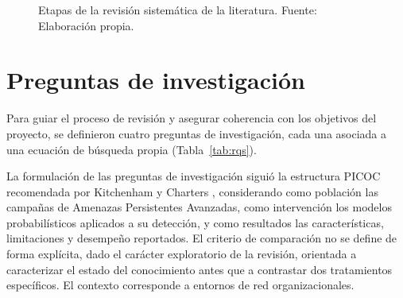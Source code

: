 \begin{figure}[h!]
{%
}
\caption{Etapas de la revisión sistemática de la literatura. Fuente: Elaboración propia.}
\label{fig:metodologia}
\end{figure}
\FloatBarrier

\section{Preguntas de investigación}

Para guiar el proceso de revisión y asegurar coherencia con los objetivos del proyecto, se definieron cuatro preguntas de investigación, cada una asociada a una ecuación de búsqueda propia (Tabla~\ref{tab:rqs}).

La formulación de las preguntas de investigación siguió la estructura PICOC recomendada por Kitchenham y Charters \parencite{kitchenham2007guidelines}, considerando como población las campañas de Amenazas Persistentes Avanzadas, como intervención los modelos probabilísticos aplicados a su detección, y como resultados las características, limitaciones y desempeño reportados. El criterio de comparación no se define de forma explícita, dado el carácter exploratorio de la revisión, orientada a caracterizar el estado del conocimiento antes que a contrastar dos tratamientos específicos. El contexto corresponde a entornos de red organizacionales.

